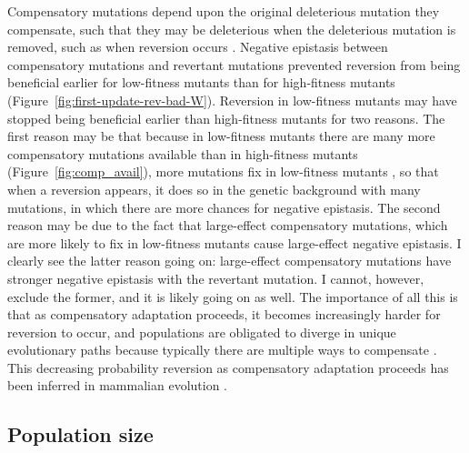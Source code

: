 \begin{doublespace}
Compensatory mutations depend upon the original deleterious mutation
they compensate, such that they may be deleterious when the deleterious mutation
is removed, such as when reversion occurs \citep{sch97,poo05,lev00}.
%
Negative epistasis between compensatory mutations and revertant mutations
prevented reversion from being beneficial earlier for low-fitness mutants
than for high-fitness mutants (Figure~\ref{fig:first-update-rev-bad-W}).
%
Reversion in low-fitness mutants may have stopped being beneficial earlier
than high-fitness mutants for two reasons.
%
The first reason may be that because in low-fitness mutants
there are many more compensatory mutations available
than in high-fitness mutants (Figure~\ref{fig:comp_avail}),
more mutations fix in low-fitness mutants \citep{moo00,san05}, so that
when a reversion appears, it does so in the genetic background
with many mutations, in which there are more chances for negative epistasis.
%
The second reason may be due to the fact that large-effect
compensatory mutations, which are more likely to fix in low-fitness mutants
cause large-effect negative epistasis.
%
I clearly see the latter reason going on: large-effect compensatory mutations
have stronger negative epistasis with the revertant mutation.
%
I cannot, however, exclude the former, and it is likely going on as well.
%
The importance of all this is that as compensatory adaptation proceeds,
it becomes increasingly harder for reversion to occur,
and populations are obligated to diverge in unique evolutionary paths
because typically there are multiple ways to compensate \citep{pau07}.
%
This decreasing probability reversion as compensatory adaptation proceeds
has been inferred in mammalian evolution \citep{soy12}.



\subsection{Population size}


\end{doublespace}
